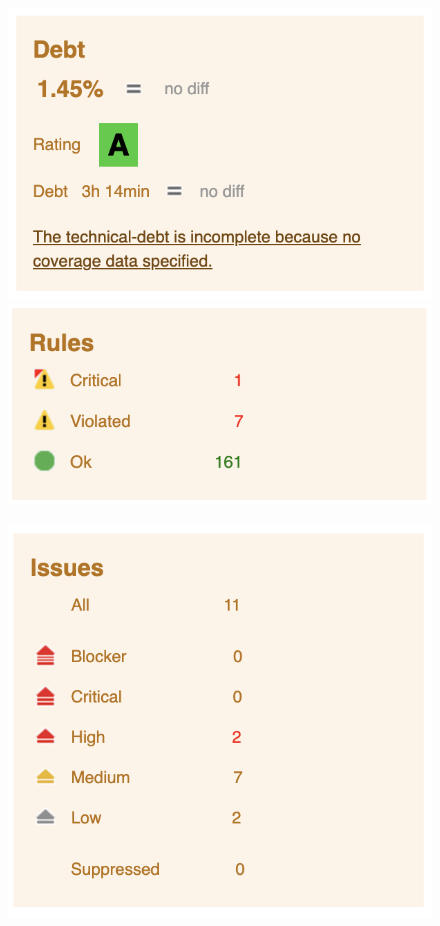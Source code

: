 \documentclass[12pt,a4paper,reqno]{report}
\begin{document}
\begin{figure}[H]
    \centering
    \begin{minipage}[b]{0.42\textwidth}
        \includegraphics[width=\textwidth]{images/Technical-debt-estimation.png} \\[1ex]
        \includegraphics[width=\textwidth]{images/Rules.png}
    \end{minipage}
    \hspace{0.5ex}
    \begin{minipage}[b]{0.53\textwidth}
        \includegraphics[width=\textwidth]{images/Issues.png}

\end{minipage}
\end{figure}
\end{document}
